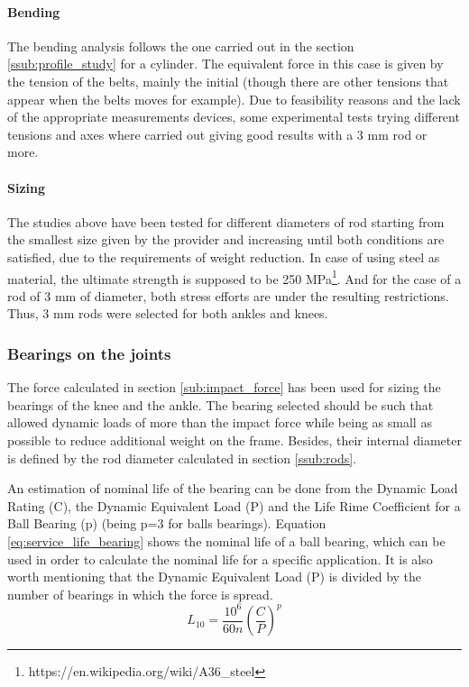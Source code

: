   \paragraph{Bending} %
  \label{ssub:bending}
  The bending analysis follows the one carried out in the section \ref{ssub:profile_study} for a cylinder.
  The equivalent force in this case is given by the tension of the belts, mainly the initial (though there are other tensions that appear when the belts moves for example).
  Due to feasibility reasons and the lack of the appropriate measurements devices, some experimental tests trying different tensions and axes where carried out giving good results with a 3 mm rod or more.

  \paragraph{Sizing} %
  \label{ssub:sizing}
  The studies above have been tested for different diameters of rod starting from the smallest size given by the provider and increasing until both conditions are satisfied, due to the requirements of weight reduction.
  In case of using steel as material, the ultimate strength is supposed to be 250 MPa\footnote{https://en.wikipedia.org/wiki/A36\_steel}.
  And for the case of a rod of 3 mm of diameter, both stress efforts are under the resulting restrictions.
  Thus, 3 mm rods were selected for both ankles and knees.

\subsubsection{Bearings on the joints} %
\label{ssub:bearings}
The force calculated in section \ref{sub:impact_force} has been used for sizing the bearings of the knee and the ankle.
The bearing selected should be such that allowed dynamic loads of more than the impact force while being as small as possible to reduce additional weight on the frame.
Besides, their internal diameter is defined by the rod diameter calculated in section \ref{ssub:rods}.

An estimation of nominal life of the bearing can be done from the Dynamic Load Rating (C), the Dynamic Equivalent Load (P) and the Life Rime Coefficient for a Ball Bearing (p) (being p=3 for balls bearings).
Equation \ref{eq:service_life_bearing} shows the nominal life of a ball bearing, which can be used in order to calculate the nominal life for a specific application.
It is also worth mentioning that the Dynamic Equivalent Load (P) is divided by the number of bearings in which the force is spread.
\begin{equation}
  \label{eq:service_life_bearing}
  L_{10} = \frac{10^{6}}{60 n} \left(\frac{C}{P}\right)^{p}
\end{equation}

